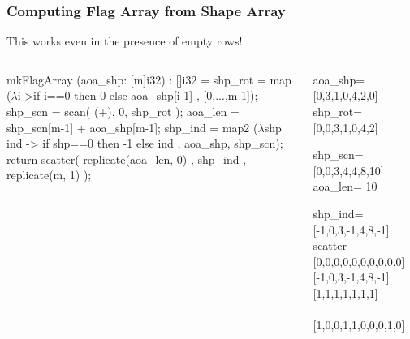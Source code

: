 \documentclass{beamer}
\newcommand{\emp}[1]{\textcolor{DikuRed}{ #1}}
\newcommand{\mymath}[1]{$ #1 $}
\begin{document}
\begin{frame}[fragile,t]
  \frametitle{Computing Flag Array from Shape Array}

This works even in the presence of empty rows!\bigskip

\begin{columns}
\begin{colorcode}
mkFlagArray (aoa_shp: [m]i32) : []i32 =
  shp_rot = map (\mymath{\lambda}i->if i==0 then 0
                      else aoa_shp[i-1]
                , [0,...,m-1]);
  shp_scn = scan( (+), 0, shp_rot );
  aoa_len = shp_scn[m-1] + aoa_shp[m-1];
  shp_ind = map2 (\mymath{\lambda}shp ind ->
                   if shp==0 then -1
                             else ind
                 , aoa_shp, shp_scn);
  return 
    scatter( replicate(aoa_len, 0)
           , shp_ind
           , replicate(m, 1) );
\end{colorcode}
\begin{colorcode}[fontsize=\scriptsize]
\emp{aoa_shp=[0,3,1,0,4,2,0]}\pause
\emp{shp_rot=[0,0,3,1,0,4,2]}\pause

\emp{shp_scn=[0,0,3,4,4,8,10]}\pause
\emp{aoa_len= 10}

\emp{shp_ind=} \pause
      \emp{[-1,0,3,-1,4,8,-1]}
\emp{scatter}\pause
  \emp{[0,0,0,0,0,0,0,0,0,0]}
  \emp{[-1,0,3,-1,4,8,-1]}
  \emp{[1,1,1,1,1,1,1]}
  \emp{---------------------}
  \emp{[1,0,0,1,1,0,0,0,1,0]}
\end{colorcode}
\end{columns}

\end{frame}
\end{document}
